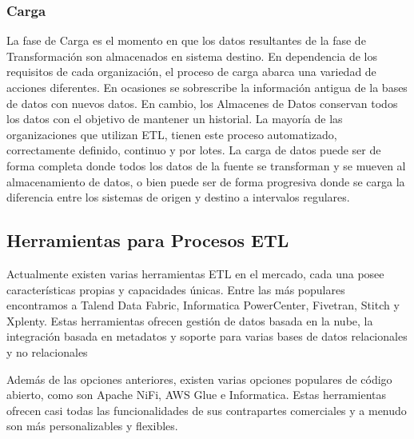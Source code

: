 \subsubsection{Carga}

La fase de Carga es el momento en que los datos resultantes de la fase de Transformaci\'on son almacenados en sistema destino. 
En dependencia de los requisitos de cada organización, el proceso de carga abarca una variedad de acciones diferentes. 
En ocasiones se sobrescribe la información antigua de la bases de datos con nuevos datos. En cambio, los Almacenes de Datos 
conservan todos los datos con el objetivo de mantener un historial. La mayoría de las organizaciones que utilizan ETL, 
tienen este proceso automatizado, correctamente definido, continuo y por lotes\cite{ETL_amazon}. La carga de datos puede
ser de forma completa donde todos los datos de la fuente se transforman y se mueven al almacenamiento de datos, o bien 
puede ser de forma progresiva donde se carga la diferencia entre los sistemas de origen y destino a intervalos regulares.

\subsection{Herramientas para Procesos ETL}

Actualmente existen varias herramientas ETL en el mercado, cada una posee características propias y capacidades \'unicas. 
Entre las m\'as populares encontramos a Talend Data Fabric, Informatica PowerCenter, Fivetran, Stitch y Xplenty. Estas 
herramientas ofrecen gestión de datos basada en la nube, la integración basada en metadatos y soporte para varias bases 
de datos relacionales y no relacionales

Además de las opciones anteriores, existen varias opciones populares de c\'odigo abierto, como son Apache NiFi, AWS Glue 
e Informatica. Estas herramientas ofrecen casi todas las funcionalidades de sus contrapartes comerciales y a menudo 
son m\'as personalizables y flexibles.